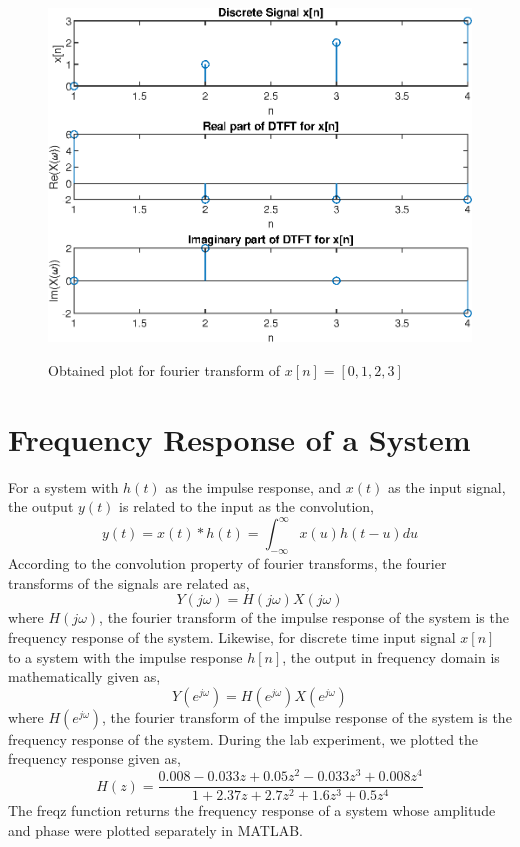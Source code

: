 \documentclass{lab_sheet}
\begin{document}
    \begin{figure}[H]
        \centering
        \includegraphics[scale=0.6]{./Figures/fourier_transform}
        \label{fig:fourier}
        \caption{Obtained plot for fourier transform of $x[n]=[0,1,2,3]$}
    \end{figure}

    \section{Frequency Response of a System}
    For a system with $h(t)$ as the impulse response, and $x(t)$ as the input signal, the output $y(t)$ is related to the input as the convolution,
    $$
    y(t)=x(t)*h(t)=\int_{-\infty}^{\infty}x(u)h(t-u)du
    $$
    According to the convolution property of fourier transforms, the fourier transforms of the signals are related as,
    $$
    Y(j\omega)=H(j\omega)X(j\omega)
    $$
    where $H(j\omega)$, the fourier transform of the impulse response of the system is the frequency response of the system. Likewise, for discrete time input signal $x[n]$ to a system with the impulse response $h[n]$, the output in frequency domain is mathematically given as,
    $$
    Y(e^{j\omega})=H(e^{j\omega})X(e^{j\omega})
    $$
    where $H(e^{j\omega})$, the fourier transform of the impulse response of the system is the frequency response of the system.
    During the lab experiment, we plotted the frequency response given as,
    $$
    H(z)=\frac{0.008-0.033z+0.05z^2-0.033z^3+0.008z^4}{1+2.37z+2.7z^2+1.6z^3+0.5z^4}
    $$
    The freqz function returns the frequency response of a system whose amplitude and phase were plotted separately in MATLAB.
\end{document}
